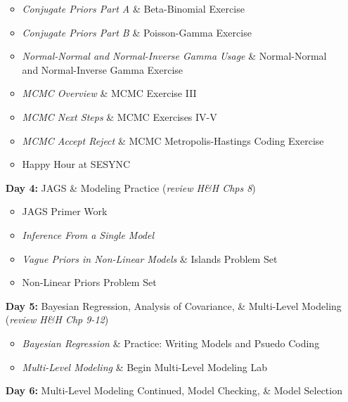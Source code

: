 \documentclass[11pt]{article}
\begin{document}
\begin{enumerate}
\begin{itemize}
\item \emph{Conjugate Priors Part A} \& Beta-Binomial Exercise %
\item \emph{Conjugate Priors Part B} \& Poisson-Gamma Exercise%
\item \emph{Normal-Normal and Normal-Inverse Gamma Usage} \& Normal-Normal and Normal-Inverse Gamma Exercise %
\item \emph{MCMC Overview} \& MCMC Exercise III %
\item \emph{MCMC Next Steps} \& MCMC Exercises IV-V %
\item \emph{MCMC Accept Reject} \& MCMC Metropolis-Hastings Coding Exercise %
\item Happy Hour at SESYNC 
\end{itemize}

\newpage 

\item[\textbf{Day 4:}] JAGS \& Modeling Practice (\emph{review H\&H Chps 8})

\begin{itemize}
\item JAGS Primer Work
\item \emph{Inference From a Single Model}  %
\item \emph{Vague Priors in Non-Linear Models} \& Islands Problem Set  %
\item Non-Linear Priors Problem Set  %
\end{itemize}

\item[\textbf{Day 5:}] Bayesian Regression, Analysis of Covariance, \& Multi-Level Modeling (\emph{review H\&H Chp 9-12})

\begin{itemize}
\item \emph{Bayesian Regression} \& Practice: Writing Models and Psuedo Coding %
\item \emph{Multi-Level Modeling} \& Begin Multi-Level Modeling Lab  %
\end{itemize}


\item[\textbf{Day 6:}] Multi-Level Modeling Continued, Model Checking, \& Model Selection


\end{enumerate}
\end{document}
